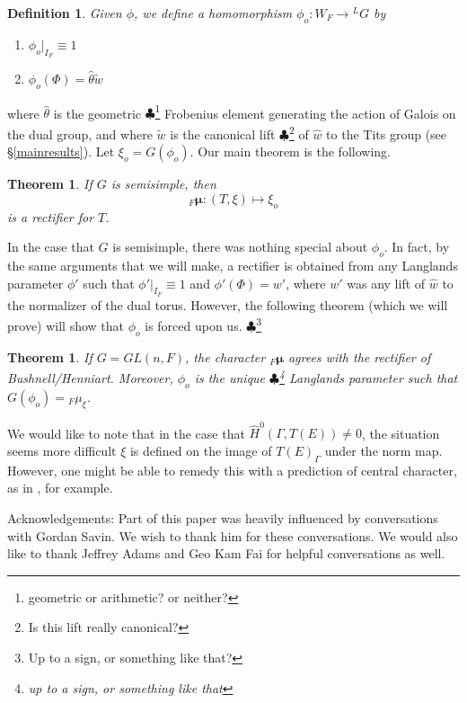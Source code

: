 \documentclass[11pt]{amsart}
\theoremstyle{plain}
\newtheorem{theorem}[enumi]{Theorem}
\newtheorem{definition}[enumi]{Definition}
\newcommand{\MAxxx}[1]{$\clubsuit$\footnote{#1}}
\begin{document}
\begin{definition}
Given $\phi$, we define a homomorphism $\phi_o : W_F \rightarrow {}^L G$ by
\begin{enumerate}
\item $\phi_o|_{I_F} \equiv 1$
\item $\phi_o(\Phi) = \hat{\theta} \tilde{w}$
\end{enumerate}
\end{definition}

where $\hat{\theta}$ is the geometric \MAxxx{geometric or arithmetic?  or neither?} Frobenius element generating the action of Galois on the dual group, and where $\tilde{w}$ is the canonical lift \MAxxx{Is this lift really canonical?} of $\hat{w}$ to the Tits group (see \S\ref{mainresults}). Let $\xi_o = G(\phi_o)$.  Our main theorem is the following.

\begin{theorem}
If $G$ is semisimple, then $${}_F \boldsymbol\mu : (T, \xi) \mapsto \xi_o$$ is a rectifier for $T$.
\end{theorem}

In the case that $G$ is semisimple, there was nothing special about $\phi_o$.  In fact, by the same arguments that we will make, a rectifier is obtained from any Langlands parameter $\phi'$ such that $\phi'|_{I_F} \equiv 1$ and $\phi'(\Phi) = w'$, where $w'$ was any lift of $\hat{w}$ to the normalizer of the dual torus.  However, the following theorem (which we will prove) will show that $\phi_o$ is forced upon us. \MAxxx{Up to a sign, or something like that?}

\begin{theorem}
If $G = GL(n,F)$, the character ${}_F \boldsymbol\mu$ agrees with the rectifier of Bushnell/Henniart.  Moreover, $\phi_o$ is the unique \MAxxx{up to a sign, or something like that} Langlands parameter such that $G(\phi_o) = {}_F \mu_{\xi}$.
\end{theorem}

We would like to note that in the case that $\hat{H}^0(\Gamma, T(E)) \neq 0$, the situation seems more difficult $\xi$ is defined on the image of $T(E)_{\Gamma}$ under the norm map.  However, one might be able to remedy this with a prediction of central character, as in \cite{grossreeder}, for example.

Acknowledgements: Part of this paper was heavily influenced by conversations with Gordan Savin.  We wish to thank him for these conversations.  We would also like to thank Jeffrey Adams and Geo Kam Fai for helpful conversations as well.
\end{document}
